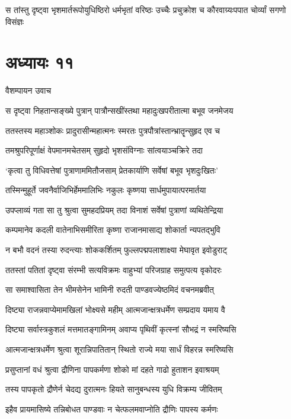 \twolineshloka
{स तांस्तु दृष्ट्वा भृशमार्तरूपोयुधिष्ठिरो धर्मभृतां वरिष्ठः}
{उच्चैः प्रचुक्रोश च कौरवाग्र्यःपपात चोर्व्यां सगणो विसंज्ञः}


\chapter{अध्यायः ११}
\twolineshloka
{वैशम्पायन उवाच}
{}


\twolineshloka
{स दृष्ट्वा निहतान्सङ्ख्ये पुत्रान् पात्रौन्सखींस्तथा}
{महादुःखपरीतात्मा बभूव जनमेजय}


\twolineshloka
{ततस्तस्य महाञ्शोकः प्रादुरासीन्महात्मनः}
{स्मरतः पुत्रपौत्रांस्तान्भ्रातॄन्सुहृद एव च}


\twolineshloka
{तमश्रुपरिपूर्णाक्षं वेपमानमचेतसम्}
{सुहृदो भृशसंविग्नाः सांत्वयाञ्चक्रिरे तदा}


\twolineshloka
{`कृत्वा तु विधिवत्तेषां पुत्राणाममितौजसाम्}
{प्रेतकार्याणि सर्वेषां बभूव भृशदुःखितः'}


\twolineshloka
{तस्मिन्मुहूर्ते जवनैर्वाजिभिर्हेममालिभिः}
{नकुलः कृष्णया सार्धमुपायात्परमार्तया}


\twolineshloka
{उपप्लाव्यं गता सा तु श्रुत्वा सुमहदप्रियम्}
{तदा विनाशं सर्वेषां पुत्राणां व्यथितेन्द्रिया}


\twolineshloka
{कम्पमानेव कदली वातेनाभिसमीरिता}
{कृष्णा राजानमासाद्य शोकार्ता न्यपतद्भुवि}


\twolineshloka
{न बभौ वदनं तस्या रुदन्त्याः शोककर्शितम्}
{फुल्लपद्मपलाशाक्ष्या मेघावृत इवोडुराट्}


\twolineshloka
{ततस्तां पतितां दृष्ट्वा संरम्भी सत्यविक्रमः}
{वाहुभ्यां परिजग्राह समुत्पत्य वृकोदरः}


\twolineshloka
{सा समाश्वासिता तेन भीमसेनेन भामिनी}
{रुदती पाण्डवज्येष्ठमिदं वचनमब्रवीत्}


\twolineshloka
{दिष्ट्या राजन्नवाप्येमामखिलां भोक्ष्यसे महीम्}
{आत्मजान्क्षत्रधर्मेण सम्प्रदाय यमाय वै}


\twolineshloka
{दिष्ट्या सर्वास्त्रकुशलं मत्तमातङ्गामिनम्}
{अवाप्य पृथिवीं कृत्स्नां सौभद्रं न स्मरिष्यसि}


\twolineshloka
{आत्मजान्क्षत्रधर्मेण श्रुत्वा शूरान्निपातितान्}
{स्थितो राज्ये मया सार्धं विहरन्न स्मरिष्यसि}


\twolineshloka
{प्रसुप्तानां वधं श्रुत्वा द्रौणिना पापकर्मणा}
{शोको मां दहते गाढो हुताशन इवाश्रयम्}


\twolineshloka
{तस्य पापकृतो द्रौणेर्न चेदद्य दुरात्मनः}
{हियते सानुबन्धस्य युधि विक्रम्य जीवितम्}


\twolineshloka
{इहैव प्रायमासिष्ये तन्निबोधत पाण्डवाः}
{न चेत्फलमवाप्नोति द्रौणिः पापस्य कर्मणः}


